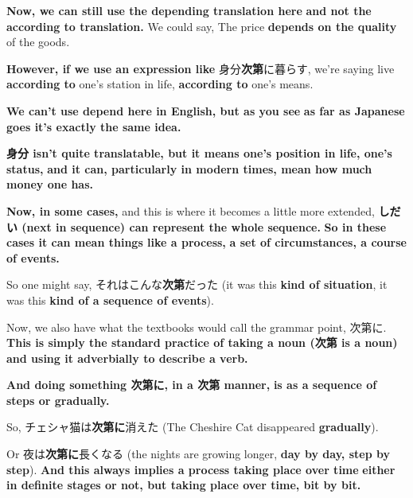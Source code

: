 \thinrule

{\bf Now, we can still use the depending translation here} {\bf and not the according to translation.} We could say, The price {\bf depends on the quality} of the goods.

{\bf However, if we use an expression like} 身分{\bf 次第}に暮らす, we're saying live {\bf according to} one's station in life, {\bf according to} one's means.

{}

{\bf We can't use depend here in English, but as you see} {\bf as far as Japanese goes it's exactly the same idea.}

\thinrule

{\bf 身分 isn't quite translatable, but it means one's position in life, one's status,} {\bf and it can, particularly in modern times, mean how much money one has.}

\stopsectionlevel

\startsectionlevel[title={次第 as a process, a set of circumstances, a course of events},reference={次第-as-a-process-a-set-of-circumstances-a-course-of-events}]

{\bf Now, in some cases,} and this is where it becomes a little more extended, {\bf しだい (next in sequence) can represent the whole sequence.} {\bf So in these cases it can mean things like a process,} {\bf a set of circumstances, a course of events.}

So one might say, それはこんな{\bf 次第}だった (it was this {\bf kind of situation}, it was this {\bf kind of a sequence of events}).

\stopsectionlevel

\startsectionlevel[title={次第に},reference={次第に}]

Now, we also have what the textbooks would call the grammar point, 次第に. {\bf This is simply the standard practice of taking a noun (次第 is a noun)} {\bf and using it adverbially to describe a verb.}

{\bf And doing something 次第に, in a 次第 manner,} {\bf is as a sequence of steps or gradually.}

So, チェシャ猫は{\bf 次第に}消えた (The Cheshire Cat disappeared {\bf gradually}).

{}

Or 夜は{\bf 次第に}長くなる (the nights are growing longer, {\bf day by day, step by step}). {\bf And this always implies a process taking place over time} {\bf either in definite stages or not, but taking place over time, bit by bit.}

